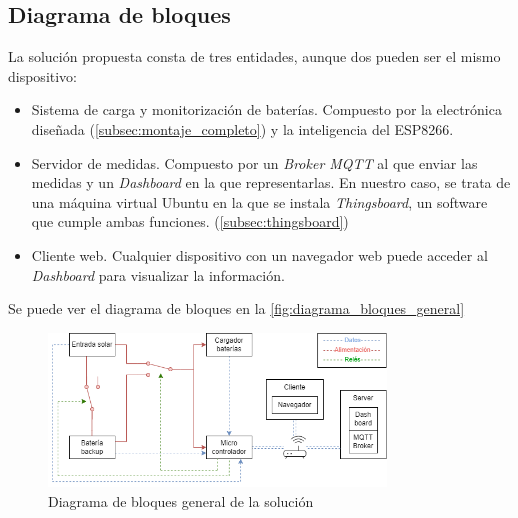\subsection{Diagrama de bloques}

La solución propuesta consta de tres entidades, aunque dos pueden ser el mismo dispositivo: \begin{itemize}
    \item Sistema de carga y monitorización de baterías. Compuesto por la electrónica diseñada (\autoref{subsec:montaje_completo}) y la inteligencia del ESP8266. 
    \item Servidor de medidas. Compuesto por un \textit{Broker MQTT} al que enviar las medidas y un \textit{Dashboard} en la que representarlas. En nuestro caso, se trata de una máquina virtual Ubuntu en la que se instala \textit{Thingsboard}, un software que cumple ambas funciones. (\autoref{subsec:thingsboard})
    \item Cliente web. Cualquier dispositivo con un navegador web puede acceder al \textit{Dashboard} para visualizar la información.
\end{itemize}

Se puede ver el diagrama de bloques en la \autoref{fig:diagrama_bloques_general}

\begin{figure}[H]
    \centering
    \includegraphics[width=0.8\textwidth]{images/2-hardware/bloquesGeneral.png}
    \caption{Diagrama de bloques general de la solución}
    \label{fig:diagrama_bloques_general}
\end{figure}
